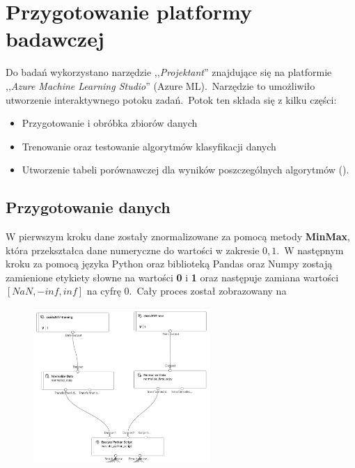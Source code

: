 \vfill
\pagebreak

\section{Przygotowanie platformy badawczej}
Do badań wykorzystano narzędzie ,,\textit{Projektant}'' znajdujące się na platformie ,,\textit{Azure Machine Learning Studio}'' (Azure ML).\ Narzędzie to umożliwiło utworzenie interaktywnego potoku zadań.\ Potok ten składa się z kilku części:
\begin{itemize}
    \item Przygotowanie i obróbka zbiorów danych
    \item Trenowanie oraz testowanie algorytmów klasyfikacji danych
    \item Utworzenie tabeli porównawczej dla wyników poszczególnych algorytmów ().
\end{itemize}

\subsection{Przygotowanie danych}
W pierwszym kroku dane zostały znormalizowane za pomocą metody \textbf{MinMax}, która przekształca dane numeryczne do wartości w zakresie ${0, 1}$.\ W następnym kroku za pomocą języka Python oraz biblioteką Pandas oraz Numpy zostają zamienione etykiety słowne na wartości \textbf{0} i \textbf{1} oraz następuje zamiana wartości $[NaN, -inf, inf]$ na cyfrę $0$.\ Cały proces został zobrazowany na 

\begin{figure}[H]
    \centering
    \includegraphics[width=0.6\textwidth]{images/norm}
    \label{fig:norm}
\end{figure}


